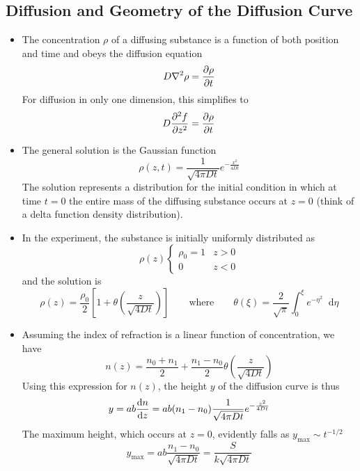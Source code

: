 \documentclass[11pt, a4paper]{article}
\newcommand{\diff}{\mathop{}\!\mathrm{d}} %
\newcommand{\eqtext}[1]{\qquad \text{#1} \qquad}
\begin{document}
\subsection{Diffusion and Geometry of the Diffusion Curve} \label{diftek:ss:diffusion}
\begin{itemize}
	\item The concentration $ \rho $ of a diffusing substance is a function of both position and time and obeys the diffusion equation 
	\begin{equation*}
		D \nabla^{2} \rho = \pdv{\rho}{t}
	\end{equation*}
	For diffusion in only one dimension, this simplifies to
	\begin{equation*}
		D \pdv[2]{f}{z} = \pdv{\rho}{t}
	\end{equation*}
	
	\item The general solution is the Gaussian function 
	\begin{equation*}
		\rho(z, t) = \frac{1}{\sqrt{4 \pi D t}}e^{-\frac{x^{2}}{4Dt}}
	\end{equation*}
	The solution represents a distribution for the initial condition in which at time $ t = 0 $ the entire mass of the diffusing substance occurs at $ z = 0 $ (think of a delta function density distribution).
	
	\item In the experiment, the substance is initially uniformly distributed as
	\begin{equation*}
		\rho(z)
		\begin{cases}
			\rho_{0} = 1 & z > 0\\
			0 & z < 0
		\end{cases}
	\end{equation*}
	and the solution is
	\begin{equation*}
		\rho(z) = \frac{\rho_{0}}{2}\left[1 + \theta\left(\frac{z}{\sqrt{4Dt}} \right) \right]  \eqtext{where} \theta(\xi) = \frac{2}{\sqrt{\pi}} \int_{0}^{\xi} e^{-\eta^{2}}\diff \eta
	\end{equation*}
	
	\item Assuming the index of refraction is a linear function of concentration, we have
	\begin{equation*}
		n(z) = \frac{n_{0} + n_{1}}{2} + \frac{n_{1} - n_{0}}{2} \theta\left(\frac{z}{\sqrt{4Dt}} \right)
	\end{equation*}
	Using this expression for $ n(z) $, the height $ y $ of the diffusion curve is thus
	\begin{equation*}
		y = ab \dv{n}{z} = ab (n_{1}- n_{0}) \frac{1}{\sqrt{4 \pi D t}}e^{-\frac{z^{2}}{4Dt}}
	\end{equation*}
	The maximum height, which occurs at $ z = 0 $, evidently falls as $ y_{\text{max}} \sim t^{-1/2} $
	\begin{equation*}
		y_{\text{max}} = ab \frac{n_{1}-n_{0}}{\sqrt{4\pi D t}} = \frac{S}{k\sqrt{4\pi D t}}
	\end{equation*}
	

\end{itemize}
\end{document}
